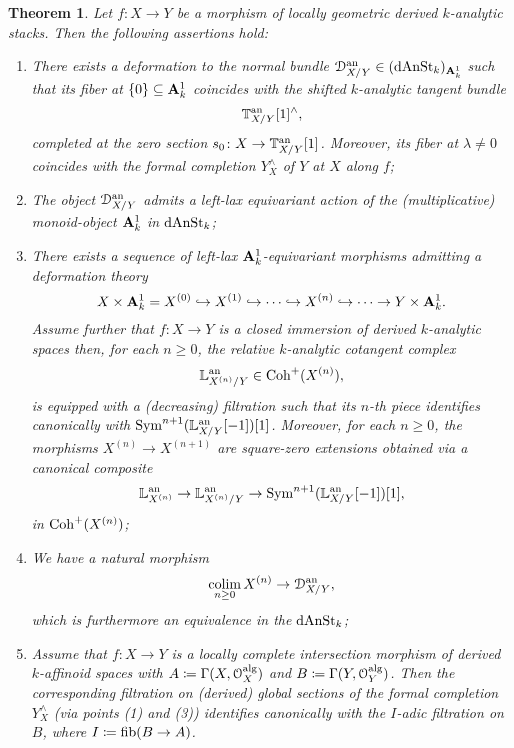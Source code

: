 \documentclass[10pt,a4paper,reqno]{amsart} %
\theoremstyle{plain}
\newtheorem{thm}{Theorem}[section]
\theoremstyle{definition}
\theoremstyle{remark}
\numberwithin{equation}{section}
\begin{document}
\begin{thm} \label{thm:main_thm}
    Let $f \colon X \to Y$ be a morphism of locally geometric derived $k$-analytic stacks. Then the following assertions hold:
    \begin{enumerate}
        \item There exists a deformation to the normal bundle $\mathcal D_{X/ Y}^\mathrm{an} \in (\mathrm{dAnSt}_k)_{\mathbf A^1_k}$ such that its fiber at $\{0 \} \subseteq \mathbf A^1_k$
        coincides with the shifted $k$-analytic tangent bundle
            \[
                \mathbb T_{X/Y}^\mathrm{an}[1]^\wedge  ,
            \]
        completed at the zero section $s_0 \colon X \to \mathbb T^\mathrm{an}_{X/ Y}[1]$. Moreover, its fiber at $\lambda \neq 0$ coincides with the formal completion $Y^\wedge_X$ of $Y$ at $X$ along $f$;
        \item The object $\mathcal D_{X/ Y}^\mathrm{an}$ admits a left-lax equivariant action of the (multiplicative) monoid-object $\mathbf A^1_k$ in $\mathrm{dAnSt}_k$;
        \item There exists a sequence of left-lax $\mathbf A^1_k$-equivariant morphisms admitting a deformation theory
            \[
                X \times \mathbf A^1_k = X^{(0)} \hookrightarrow X^{(1)} \hookrightarrow \dots \hookrightarrow X^{(n)} \hookrightarrow \dots \to Y \times \mathbf A^1_k.
            \]
        Assume further that $f\colon X \to Y$ is a closed immersion of derived $k$-analytic spaces then, for each $n \ge 0$,
        the relative $k$-analytic cotangent complex
            \[
                \mathbb L^\mathrm{an}_{X^{(n)}/ Y} \in \mathrm{Coh}^+(X^{(n)}),  
            \]
        is equipped with a (decreasing) filtration such that its $n$-th piece identifies canonically with $\operatorname{Sym}^{n+1}(\mathbb L^\mathrm{an}_{X/ Y}[-1])[1]$.
        Moreover, for each $n \ge 0$, the morphisms
        $X^{(n)} \to X^{(n+1)}$ are square-zero extensions obtained via a canonical composite
            \[
                \mathbb L^\mathrm{an}_{X^{(n)}} \to \mathbb L^\mathrm{an}_{X^{(n)}/ Y} \to   \operatorname{Sym}^{n+1}(\mathbb L_{X/ Y}^\mathrm{an}[-1])[1],
            \]
        in $\mathrm{Coh}^+(X^{(n)})$;
        \item We have a natural morphism
            \[
                \operatorname*{colim}_{n \ge 0} X^{(n)} \to \mathcal D_{X/ Y}^\mathrm{an},   
            \]
        which is furthermore an equivalence in the \infcat $\mathrm{dAnSt}_k$;
        \item Assume that $f \colon X \to Y$ is a locally complete intersection morphism of derived $k$-affinoid spaces with $A \coloneqq \Gamma(X, \mathcal O_X^\mathrm{alg})$
        and $B \coloneqq \Gamma(Y, \mathcal O_Y^\mathrm{alg})$. Then the corresponding filtration on (derived)
        global sections of the formal completion $Y^{\wedge}_X$ (via points (1) and (3)) identifies canonically with the $I$-adic filtration on
        $B$, where $I \coloneqq \mathrm{fib}(B \to A)$.
    \end{enumerate}
\end{thm}
\end{document}
